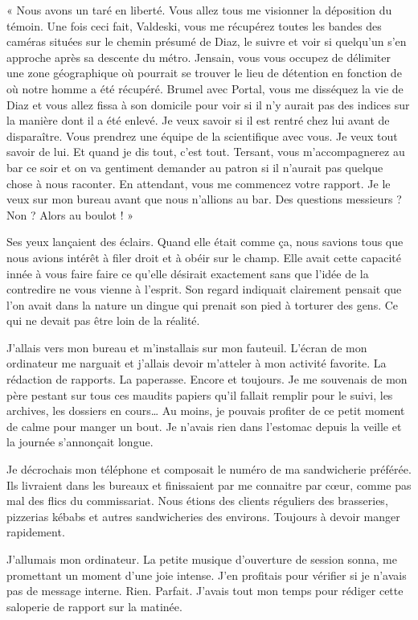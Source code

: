 « Nous avons un taré en liberté. Vous allez tous me visionner la déposition du témoin. Une fois ceci fait, Valdeski, 
vous me récupérez toutes les bandes des caméras situées sur le chemin présumé de Diaz, le suivre et voir si quelqu'un 
s'en approche après sa descente du métro. Jensain, vous vous occupez de délimiter une zone géographique où pourrait se 
trouver le lieu de détention en fonction de où notre homme a été récupéré. Brumel avec Portal, vous me disséquez la vie 
de Diaz et vous allez fissa à son domicile pour voir si il n'y aurait pas des indices sur la manière dont il a été 
enlevé. Je veux savoir si il est rentré chez lui avant de disparaître. Vous prendrez une équipe de la scientifique avec 
vous. Je veux tout savoir de lui. Et quand je dis tout, c'est tout. Tersant, vous m'accompagnerez au bar ce soir et on 
va gentiment demander au patron si il n'aurait pas quelque chose à nous raconter. En attendant, vous me commencez votre 
rapport. Je le veux sur mon bureau avant que nous n'allions au bar. Des questions messieurs ? Non ? Alors au boulot ! »

Ses yeux lançaient des éclairs. Quand elle était comme ça, nous savions tous que nous avions intérêt à filer droit et à
obéir sur le champ. Elle avait cette capacité innée à vous faire faire ce qu'elle désirait exactement sans que l'idée 
de la contredire ne vous vienne à l'esprit. Son regard indiquait clairement pensait que l'on avait dans la nature un 
dingue qui prenait son pied à torturer des gens. Ce qui ne devait pas être loin de la réalité.

J'allais vers mon bureau et m'installais sur mon fauteuil. L'écran de mon ordinateur me narguait et j'allais devoir 
m'atteler à mon activité favorite. La rédaction de rapports. La paperasse. Encore et toujours. Je me souvenais de 
mon père pestant sur tous ces maudits papiers qu'il fallait remplir pour le suivi, les archives, les dossiers en 
cours… Au moins, je pouvais profiter de ce petit moment de calme pour manger un bout. Je n'avais rien dans l'estomac 
depuis la veille et la journée s'annonçait longue.

Je décrochais mon téléphone et composait le numéro de ma sandwicherie préférée. Ils livraient dans les bureaux et 
finissaient par me connaitre par cœur, comme pas mal des flics du commissariat. Nous étions des clients réguliers des 
brasseries, pizzerias kébabs et autres sandwicheries des environs. Toujours à devoir manger rapidement.

J'allumais mon ordinateur. La petite musique d'ouverture de session sonna, me promettant un moment d'une joie intense. 
J'en profitais pour vérifier si je n'avais pas de message interne. Rien. Parfait. J'avais tout mon temps pour rédiger 
cette saloperie de rapport sur la matinée.

